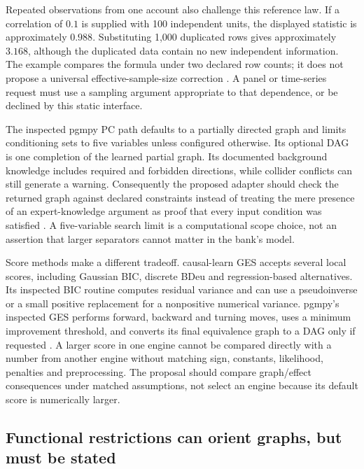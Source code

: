 Repeated observations from one account also challenge this reference law. If a
correlation of \(0.1\) is supplied with 100 independent units, the displayed
statistic is approximately \(0.988\). Substituting 1,000 duplicated rows gives
approximately \(3.168\), although the duplicated data contain no new
independent information. The example compares the formula under two declared
row counts; it does not propose a universal effective-sample-size correction
\citep{exec13_pydisc_examples}. A panel or time-series request must use a
sampling argument appropriate to that dependence, or be declined by this
static interface.

The inspected pgmpy PC path defaults to a partially directed graph and limits
conditioning sets to five variables unless configured otherwise. Its optional
DAG is one completion of the learned partial graph. Its documented background
knowledge includes required and forbidden directions, while collider conflicts
can still generate a warning. Consequently the proposed adapter should check
the returned graph against declared constraints instead of treating the mere
presence of an expert-knowledge argument as proof that every input condition
was satisfied \citep{exec13_pydisc_pgmpy}. A five-variable search limit is a
computational scope choice, not an assertion that larger separators cannot
matter in the bank's model.

Score methods make a different tradeoff. causal-learn GES accepts several
local scores, including Gaussian BIC, discrete BDeu and regression-based
alternatives. Its inspected BIC routine computes residual variance and can use
a pseudoinverse or a small positive replacement for a nonpositive numerical
variance. pgmpy's inspected GES performs forward, backward and turning moves,
uses a minimum improvement threshold, and converts its final equivalence graph
to a DAG only if requested
\citep{exec13_pydisc_causallearn,exec13_pydisc_pgmpy}. A larger score in one
engine cannot be compared directly with a number from another engine without
matching sign, constants, likelihood, penalties and preprocessing. The
proposal should compare graph/effect consequences under matched assumptions,
not select an engine because its default score is numerically larger.

\subsection{Functional restrictions can orient graphs, but must be stated}


